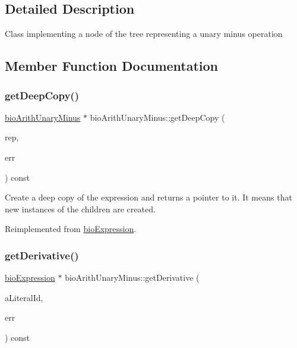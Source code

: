\subsection{Detailed Description}
Class implementing a node of the tree representing a unary minus operation 

\subsection{Member Function Documentation}
\mbox{\label{classbio_arith_unary_minus_a1bd7f28b742866f8a8e84b5f8405fbd1}} 
\subsubsection{\texorpdfstring{get\+Deep\+Copy()}{getDeepCopy()}}
{\footnotesize\ttfamily \hyperlink{classbio_arith_unary_minus}{bio\+Arith\+Unary\+Minus} $\ast$ bio\+Arith\+Unary\+Minus\+::get\+Deep\+Copy (\begin{DoxyParamCaption}\item[{\hyperlink{classbio_expression_repository}{bio\+Expression\+Repository} $\ast$}]{rep,  }\item[{pat\+Error $\ast$\&}]{err }\end{DoxyParamCaption}) const\hspace{0.3cm}{\ttfamily [virtual]}}

Create a deep copy of the expression and returns a pointer to it. It means that new instances of the children are created. 

Reimplemented from \hyperlink{classbio_expression_a4ee1b8add634078a02eaae26cd40dcc8}{bio\+Expression}.

\mbox{\label{classbio_arith_unary_minus_aaf1b155993a12037850b1a22dbb36f7c}} 
\subsubsection{\texorpdfstring{get\+Derivative()}{getDerivative()}}
{\footnotesize\ttfamily \hyperlink{classbio_expression}{bio\+Expression} $\ast$ bio\+Arith\+Unary\+Minus\+::get\+Derivative (\begin{DoxyParamCaption}\item[{pat\+U\+Long}]{a\+Literal\+Id,  }\item[{pat\+Error $\ast$\&}]{err }\end{DoxyParamCaption}) const\hspace{0.3cm}{\ttfamily [virtual]}}

